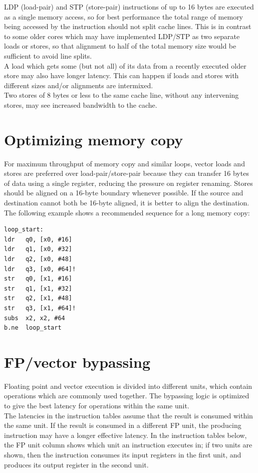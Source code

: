 \documentclass{article}
\begin{document}
LDP (load-pair) and STP (store-pair) instructions of up to 16 bytes
are executed as a single memory access, so for best performance the
total range of memory being accessed by the instruction should not
split cache lines. This is in contrast to some older cores which may
have implemented LDP/STP as two separate loads or stores, so that
alignment to half of the total memory size would be sufficient to
avoid line splits. \\

A load which gets some (but not all) of its data from a recently
executed older store may also have longer latency. This can happen if
loads and stores with different sizes and/or alignments are
intermixed. \\

Two stores of 8 bytes or less to the same cache line, without any
intervening stores, may see increased bandwidth to the cache.

\section{Optimizing memory copy}

For maximum throughput of memory copy and similar loops, vector loads
and stores are preferred over load-pair/store-pair because they can
transfer 16 bytes of data using a single register, reducing the
pressure on register renaming. Stores should be aligned on a 16-byte
boundary whenever possible. If the source and destination cannot both
be 16-byte aligned, it is better to align the destination. The
following example shows a recommended sequence for a long memory copy:
\begin{verbatim}
loop_start:
ldr   q0, [x0, #16]
ldr   q1, [x0, #32]
ldr   q2, [x0, #48]
ldr   q3, [x0, #64]!
str   q0, [x1, #16]
str   q1, [x1, #32]
str   q2, [x1, #48]
str   q3, [x1, #64]!
subs  x2, x2, #64
b.ne  loop_start
\end{verbatim}

\section{FP/vector bypassing}

Floating point and vector execution is divided into different units,
which contain operations which are commonly used together. The
bypassing logic is optimized to give the best latency for operations
within the same unit. \\

The latencies in the instruction tables assume that the result is
consumed within the same unit. If the result is consumed in a
different FP unit, the producing instruction may have a longer
effective latency. In the instruction tables below, the FP unit column
shows which unit an instruction executes in; if two units are shown,
then the instruction consumes its input registers in the first unit,
and produces its output register in the second unit. \\
\end{document}
